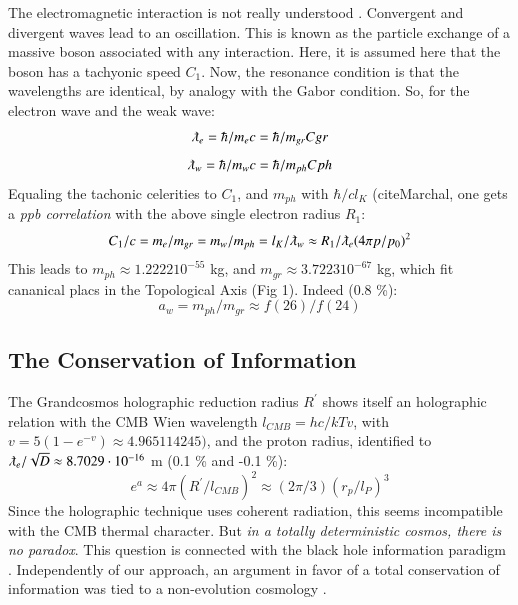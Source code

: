 \documentclass[twoside,draft]{article}
\begin{document}
\begin{sloppypar}
The electromagnetic interaction is not really understood \cite{Okun}. Convergent and divergent waves lead to an oscillation\cite{Sanchez1}. This is known as the particle exchange of a massive boson associated with any interaction. Here, it is assumed here that the boson has a tachyonic speed $C_1$. Now, the resonance condition is that the wavelengths are identical, by analogy with the Gabor condition\cite{Gabor}. So, for the electron wave and the weak wave:
\begin{equation}
\lambdabar_e = \hbar/m_e c = \hbar / m_{gr}C{gr}
\end{equation}
\begin{equation}
\lambdabar_w = \hbar/m_w c = \hbar / m_{ph}C{ph}
\end{equation}
Equaling the tachonic celerities to $C_1$, and $m_{ph}$ with $\hbar/cl_K$ (cite{Marchal}, one gets a \textit{ppb correlation} with the above single electron radius $R_1$:
\begin{equation}
C_1/c = m_e/m_{gr} = m_w/m_{ph} = l_K/\lambdabar_w \approx R_1/\lambdabar_e (4\pi p/p_0)^2 
\end{equation}
This leads to $m_{ph} \approx 1.2222 10^{-55}$ kg, and  $m_{gr} \approx 3.7223 10^{-67}$ kg, which fit cananical placs in the Topological Axis (Fig 1). Indeed (0.8 \%):
\begin{equation}
a_w = m_{ph}/m_{gr} \approx f(26)/f(24) 
\end{equation}

\subsection{The Conservation of Information}

The Grandcosmos holographic reduction radius $R^{\prime}$ shows itself an holographic
relation with the CMB Wien wavelength $l_{CMB} = hc/kTv $, with $v = 5 (1-e^{-v}) \approx 4.965114245)$, and the proton radius, identified to $\lambdabar_e/\sqrt{D} \approx 8.7029\cdot 10^{-16}$ m (0.1 \% and -0.1 \%):
\begin{equation}
e^{a} \approx 4\pi(R^{\prime}/l_{CMB})^{2} \approx (2\pi /3) (r_p/l_P)^3 
\end{equation}
Since the holographic technique uses coherent radiation, this seems incompatible with the CMB
thermal character. But \textit{in a totally deterministic cosmos, there is no paradox}. This question is
connected with the black hole information paradigm \cite{Preskill}. Independently of our approach, an
argument in favor of a total conservation of information was tied to a non-evolution cosmology
\cite{Nikolic}. 


\end{sloppypar}
\end{document}
